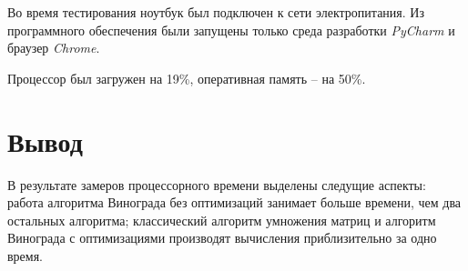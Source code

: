 Во время тестирования ноутбук был подключен к сети электропитания. Из программного обеспечения были запущены только среда разработки \textit{PyCharm} и браузер \textit{Chrome}.

Процессор был загружен на 19\%, оперативная память -- на 50\%.


\section{Вывод}

В результате замеров процессорного времени выделены следущие аспекты: работа алгоритма Винограда без оптимизаций занимает больше времени, чем два остальных алгоритма; классический алгоритм умножения матриц и алгоритм Винограда с оптимизациями производят вычисления приблизительно за одно время.

